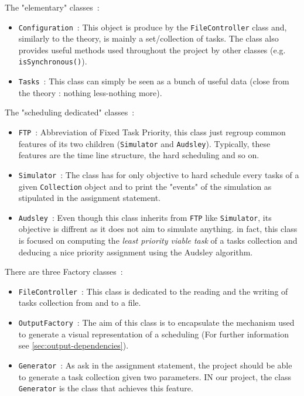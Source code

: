 \documentclass[a4paper,11pt]{article}
\begin{document}
  \noindent The "elementary" classes~:
  \begin{itemize}
    \item \verb|Configuration|~: This object is produce by the \verb|FileController| class and, similarly to the theory, is mainly a set/collection of tasks. The class also provides useful methods used throughout the project by other classes (e.g. \verb|isSynchronous()|).
    \item \verb|Tasks|~: This class can simply be seen as a bunch of useful data (close from the theory : nothing less-nothing more).
  \end{itemize}
  The "scheduling dedicated" classes~:
  \begin{itemize}
    \item \verb|FTP|~: Abbreviation of Fixed Task Priority, this class just regroup common features of its two children (\verb|Simulator| and \verb|Audsley|). Typically, these features are the time line structure, the hard scheduling and so on.
    \item \verb|Simulator|~: The class has for only objective to hard schedule every tasks of a given \verb|Collection| object and to print the "events" of the simulation as stipulated in the assignment statement.
    \item \verb|Audsley|~: Even though this class inherits from \verb|FTP| like \verb|Simulator|, its objective is diffrent as it does not aim to simulate anything. in fact, this class is focused on computing the \textit{least priority viable task} of a tasks collection and deducing a nice priority assignment using the Audsley algorithm.
  \end{itemize}
  There are three Factory classes~:
  \begin{itemize}
    \item \verb|FileController|~: This class is dedicated to the reading and the writing of tasks collection from and to a file.
    \item \verb|OutputFactory|~: The aim of this class is to encapsulate the mechanism used to generate a visual representation of a scheduling (For further information see \ref{sec:output-dependencies}).
    \item \verb|Generator|~: As ask in the assignment statement, the project should be able to generate a task collection given two parameters. IN our project, the class \verb|Generator| is the class that achieves this feature.
  \end{itemize}
\end{document}
